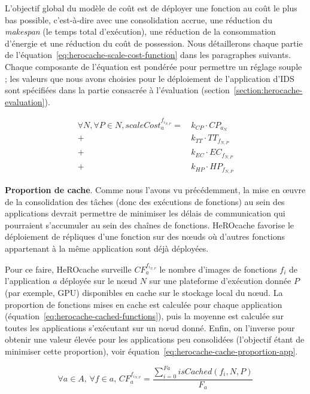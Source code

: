 L'objectif global du modèle de coût est de déployer une fonction au coût le plus bas possible, c'est-à-dire avec une consolidation accrue, une réduction du \textit{makespan} (le temps total d'exécution), une réduction de la consommation d'énergie et une réduction du coût de possession. Nous détaillerons chaque partie de l'équation~\ref{eq:herocache-scale-cost-function} dans les paragraphes suivants. Chaque composante de l'équation est pondérée pour permettre un réglage souple ; les valeurs que nous avons choisies pour le déploiement de l'application d'IDS sont spécifiées dans la partie consacrée à l'évaluation (section~\ref{section:herocache-evaluation}).

\begin{equation}
\begin{split}
 \forall N, \forall P \in N, scaleCost^{{f}_{{i}_{N, P}}}_{a} = \,   &k_{CP} \cdot {CP}_{{a}_{N}}    \\
    + &k_{TT} \cdot {TT}_{{f}_{N, P}} \\
    + &k_{EC} \cdot {EC}_{{f}_{N, P}} \\
    + &k_{HP} \cdot {HP}_{{f}_{N, P}}
\end{split}
\label{eq:herocache-scale-cost-function}
\end{equation}

\textbf{Proportion de cache}. Comme nous l'avons vu précédemment, la mise en œuvre de la consolidation des tâches (donc des exécutions de fonctions) au sein des applications devrait permettre de minimiser les délais de communication qui pourraient s'accumuler au sein des chaînes de fonctions. HeROcache favorise le déploiement de répliques d'une fonction sur des nœuds où d'autres fonctions appartenant à la même application sont déjà déployées.

Pour ce faire, HeROcache surveille $CF_{a}^{{f}_{i_{N, P}}}$ le nombre d'images de fonctions ${f}_{i}$ de l'application $a$ déployée sur le nœud $N$ sur une plateforme d'exécution donnée $P$ (par exemple, GPU) disponibles en cache sur le stockage local du nœud. La proportion de fonctions mises en cache est calculée pour chaque application (équation~\ref{eq:herocache-cached-functions}), puis la moyenne est calculée sur toutes les applications s'exécutant sur un nœud donné. Enfin, on l'inverse pour obtenir une valeur élevée pour les applications peu consolidées (l'objectif étant de minimiser cette proportion), voir équation~\ref{eq:herocache-cache-proportion-app}.

\begin{equation}
    \forall a \in A, \, \forall f \in a, \, CF_{a}^{{f}_{i_{N, P}}} = \frac{\sum_{i = 0}^{Fa} isCached(f_{i}, N, P)}{F_{a}}
\label{eq:herocache-cached-functions}
\end{equation}


